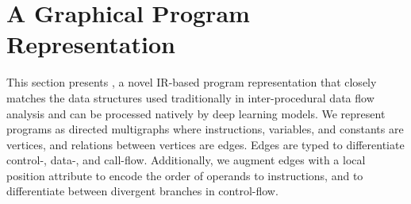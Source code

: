 \section{A Graphical Program Representation}
\label{sec:graph-representation}

This section presents \programl, a novel IR-based program representation that
closely matches the data structures used traditionally in inter-procedural data
flow analysis and can be processed natively by deep learning models. We
represent programs as directed multigraphs where instructions, variables, and
constants are vertices, and relations between vertices are edges. Edges are
typed to differentiate control-, \mbox{data-,} and call-flow. Additionally, we
augment edges with a local position attribute to encode the order of operands to
instructions, and to differentiate between divergent branches in control-flow.

